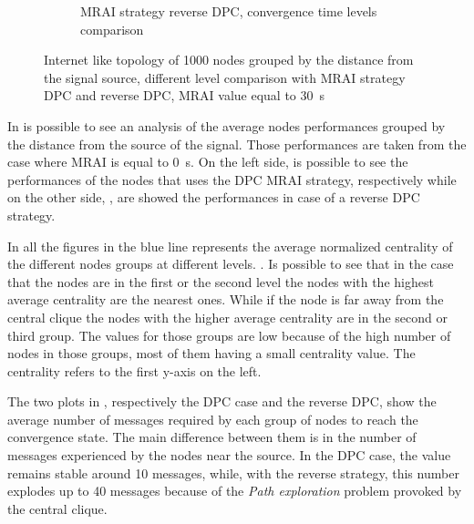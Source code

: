 \begin{figure}[h]
\begin{subfigure}[b]{0.45\textwidth}
		 \caption{\ac{MRAI} strategy reverse \ac{DPC}, convergence time levels comparison}
         \label{fig:different_levels_comparison_reverse_dpc_time}
     \end{subfigure}
     \hfill
	 \caption{Internet like topology of \num{1000} nodes grouped by the distance
	 from the signal source, different level comparison with \ac{MRAI} strategy
	 \ac{DPC} and reverse \ac{DPC}, \ac{MRAI} value equal to \SI{30}{\second}
	 }
	 \label{fig:different_levels_comparison}
\end{figure}

In  is possible to see an analysis of the
average nodes performances grouped by the distance from the source of the signal.
Those performances are taken from the case where \ac{MRAI} is equal to
\SI{0}{\second}.
On the left side, is possible to see the performances of the nodes that uses the
\ac{DPC} \ac{MRAI} strategy, respectively
while on the other side, ,
are showed the performances in case of a reverse \ac{DPC} strategy.

In all the figures in  the blue line
represents the average normalized centrality of the different nodes groups at different
levels. .
Is possible to see that in the case that the nodes are in the first or the
second level the nodes with the highest average centrality are the nearest ones.
While if the node is far away from the central clique the nodes with the
higher average centrality are in the second or third group.
The values for those groups are low because of the high number of nodes
in those groups, most of them having a small centrality value.
The centrality refers to the first y-axis on the left.

The two plots in ,
respectively the \ac{DPC} case and the reverse \ac{DPC},
show the average number of messages required by each group of nodes to reach
the convergence state.
The main difference between them is in the number of messages experienced by
the nodes near the source.
In the \ac{DPC} case, the value remains stable around \num{10} messages, while,
with the reverse strategy, this number explodes up to \num{40} messages because
of the \textit{Path exploration} problem provoked by the central clique.

